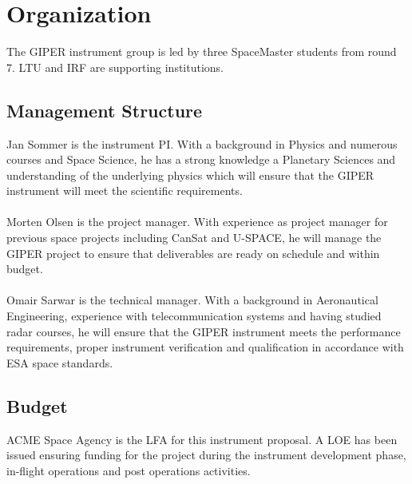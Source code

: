 \section{Organization}
%
The \ac{GIPER} instrument group is led by three SpaceMaster students from round 7. LTU and \ac{IRF} are supporting institutions.
%
\subsection{Management Structure}
%
\noindent
Jan Sommer is the instrument \ac{PI}. With a background in Physics and numerous courses and Space Science, he has a strong knowledge a Planetary Sciences and understanding of the underlying physics which will ensure that the \ac{GIPER} instrument will meet the scientific requirements.\\\\
%
\noindent
Morten Olsen is the project manager. With experience as project manager for previous space projects including CanSat and U-SPACE, he will manage the \ac{GIPER} project to ensure that deliverables are ready on schedule and within budget.\\\\
%
\noindent
Omair Sarwar is the technical manager. With a background in Aeronautical Engineering, experience with telecommunication systems and having studied radar courses, he will ensure that the \ac{GIPER} instrument meets the performance requirements, proper instrument verification and qualification in accordance with ESA space standards.
%
\subsection{Budget}
ACME Space Agency is the \ac{LFA} for this instrument proposal. A \ac{LOE} has been issued ensuring funding for the project during the instrument development phase, in-flight operations and post operations activities.